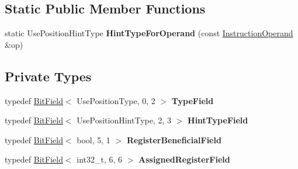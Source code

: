 \subsection*{Static Public Member Functions}
\begin{DoxyCompactItemize}
\item 
static Use\+Position\+Hint\+Type {\bfseries Hint\+Type\+For\+Operand} (const \hyperlink{classv8_1_1internal_1_1compiler_1_1_instruction_operand}{Instruction\+Operand} \&op)\hypertarget{classv8_1_1internal_1_1compiler_1_1_use_position_a7dac7388e373c36e922dd3dde55dccf3}{}\label{classv8_1_1internal_1_1compiler_1_1_use_position_a7dac7388e373c36e922dd3dde55dccf3}

\end{DoxyCompactItemize}
\subsection*{Private Types}
\begin{DoxyCompactItemize}
\item 
typedef \hyperlink{classv8_1_1internal_1_1_bit_field}{Bit\+Field}$<$ Use\+Position\+Type, 0, 2 $>$ {\bfseries Type\+Field}\hypertarget{classv8_1_1internal_1_1compiler_1_1_use_position_af5711af98388ff78b2459e1d7702789a}{}\label{classv8_1_1internal_1_1compiler_1_1_use_position_af5711af98388ff78b2459e1d7702789a}

\item 
typedef \hyperlink{classv8_1_1internal_1_1_bit_field}{Bit\+Field}$<$ Use\+Position\+Hint\+Type, 2, 3 $>$ {\bfseries Hint\+Type\+Field}\hypertarget{classv8_1_1internal_1_1compiler_1_1_use_position_af23ffab28963c6ac289435e85fcb240c}{}\label{classv8_1_1internal_1_1compiler_1_1_use_position_af23ffab28963c6ac289435e85fcb240c}

\item 
typedef \hyperlink{classv8_1_1internal_1_1_bit_field}{Bit\+Field}$<$ bool, 5, 1 $>$ {\bfseries Register\+Beneficial\+Field}\hypertarget{classv8_1_1internal_1_1compiler_1_1_use_position_a6e983d9123067f42aa08028df873ea10}{}\label{classv8_1_1internal_1_1compiler_1_1_use_position_a6e983d9123067f42aa08028df873ea10}

\item 
typedef \hyperlink{classv8_1_1internal_1_1_bit_field}{Bit\+Field}$<$ int32\+\_\+t, 6, 6 $>$ {\bfseries Assigned\+Register\+Field}\hypertarget{classv8_1_1internal_1_1compiler_1_1_use_position_af8ce5144e34b24fa79dc9cc55d310bb9}{}\label{classv8_1_1internal_1_1compiler_1_1_use_position_af8ce5144e34b24fa79dc9cc55d310bb9}

\end{DoxyCompactItemize}
